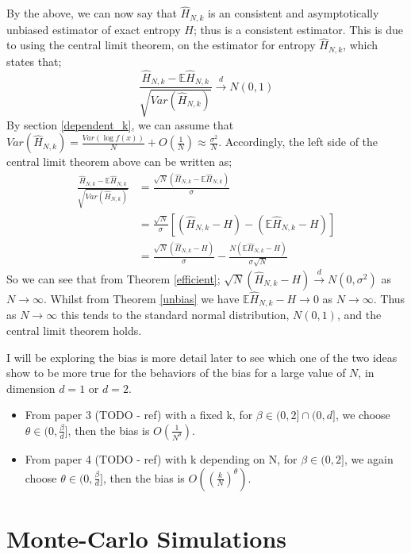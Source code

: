 \documentclass{report}
\begin{document}
By the above, we can now say that $\hat{H}_{N, k}$ is an consistent and asymptotically unbiased estimator of exact entropy $H$; thus is a consistent estimator. This is due to using the central limit theorem, on the estimator for entropy $\hat{H}_{N, k}$, which states that;
\begin{equation}
\frac{\hat{H}_{N, k} - \mathbb{E}{\hat{H}_{N, k}}}{\sqrt{Var(\hat{H}_{N, k})}} \xrightarrow{d} N(0, 1) \nonumber
\end{equation}
By section \ref{dependent_k}, we can assume that $Var(\hat{H}_{N, k}) = \frac{Var(\log f(x))}{N} + O(\frac{1}{N}) \approx \frac{\sigma^2}{N}$. Accordingly, the left side of the central limit theorem above can be written as;
\begin{align*}
\frac{\hat{H}_{N, k} - \mathbb{E}{\hat{H}_{N, k}}}{\sqrt{Var(\hat{H}_{N, k})}} &= \frac{\sqrt{N}(\hat{H}_{N, k} - \mathbb{E}{\hat{H}_{N, k}})}{\sigma} \\
&= \frac{\sqrt{N}}{\sigma}[(\hat{H}_{N, k} - H) - (\mathbb{E}{\hat{H}_{N, k}} - H)] \\
&= \frac{\sqrt{N}(\hat{H}_{N, k} - H)}{\sigma} - \frac{N(\mathbb{E}{\hat{H}_{N, k}} - H)}{\sigma \sqrt{N}}
\end{align*}
So we can see that from Theorem \ref{efficient}; $\sqrt{N}(\hat{H}_{N, k} - H) \xrightarrow{d} N(0, \sigma^2)$ as $N \to \infty$. Whilst from Theorem \ref{unbias} we have $\mathbb{E}{\hat{H}_{N, k}} - H  \to 0$ as $N \to \infty$. Thus as $N \to \infty$ this tends to the standard normal distribution, $N(0, 1)$, and the central limit theorem holds.

I will be exploring the bias is more detail later to see which one of the two ideas show to be more true for the behaviors of the bias for a large value of $N$, in dimension $d=1$ or $d=2$. 
\begin{itemize}
\item From paper 3 (TODO - ref) with a fixed k, for $\beta \in (0, 2] \cap (0, d]$, we choose $\theta \in (0, \frac{\beta}{d} ]$, then the bias is $O \left( \frac{1}{N^{\theta}} \right)$.

\item From paper 4 (TODO - ref) with k depending on N, for $\beta \in (0, 2]$, we again choose $\theta \in (0, \frac{\beta}{d} ]$, then the bias is $O\left( \left( \frac{k}{N} \right)^{\theta} \right)$.

\end{itemize}



\chapter{Monte-Carlo Simulations}
\end{document}

